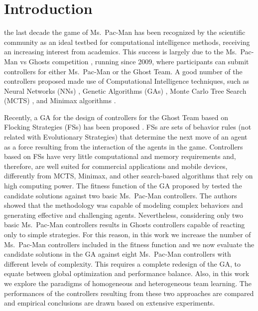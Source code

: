 \documentclass[journal]{IEEEtran}
\begin{document}
\section{Introduction}
\label{sec:Introduction}

 the last decade the game of Ms.\  Pac-Man has been recognized by the scientific community as an ideal testbed for computational intelligence methods, receiving an increasing interest from academics. This success is largely due to the Ms.\  Pac-Man vs Ghosts competition \cite{Lucas2009,MsPacManVSGhost2011}, running since 2009, where participants can submit controllers for either Ms.\  Pac-Man or the Ghost Team. A good number of the controllers proposed made use of Computational Intelligence techniques, such as Neural Networks (NNs) \cite{Rojas1996}, Genetic Algorithms (GAs) \cite{Goldberg1988}, Monte Carlo Tree Search (MCTS) \cite{Browne2012}, and Minimax algorithms \cite{Osborne1994}.

Recently, a GA for the design of controllers for the Ghost Team based on Flocking Strategies (FSs) has been proposed \cite{Liberatore2014}. FSs are sets of behavior rules (not related with Evolutionary Strategies) that determine the next move of an agent as a force resulting from the interaction of the agents in the game. Controllers based on FSs have very little computational and memory requirements and, therefore, are well suited for commercial applications and mobile devices, differently from MCTS, Minimax, and other search-based algorithms that rely on high computing power. The fitness function of the GA proposed by \cite{Liberatore2014} tested the candidate solutions against two basic Ms.\  Pac-Man controllers. The authors showed that the methodology was capable of modeling complex behaviors and generating effective and challenging agents. Nevertheless, considering only two basic Ms.\  Pac-Man controllers results in Ghosts controllers capable of reacting only to simple strategies. For this reason, in this work we increase the number of Ms.\  Pac-Man controllers included in the fitness function and we now evaluate the candidate solutions in the GA against eight Ms.\  Pac-Man controllers with different levels of complexity. This requires a complete redesign of the GA, to equate between global optimization and performance balance. Also, in this work we explore the paradigms of homogeneous and heterogeneous team learning. The performances of the controllers resulting from these two approaches are compared and empirical conclusions are drawn based on extensive experiments.
\end{document}
